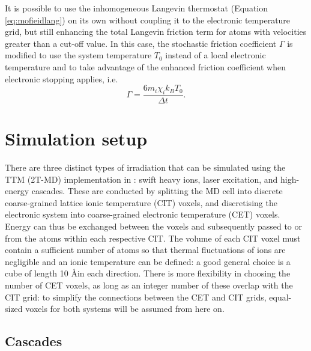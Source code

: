 It is possible to use the inhomogeneous Langevin thermostat (Equation 
\ref{eq:mofieidlang}) on its own without coupling it to the electronic 
temperature grid, but still enhancing the total Langevin friction term for 
atoms with velocities greater than a cut-off value\cite{zarkadoula-13a}. 
In this case, the stochastic friction coefficient $\Gamma$ is modified to 
use the system temperature $T_0$ instead of a local electronic 
temperature and to take advantage of the enhanced friction coefficient 
when electronic stopping applies, i.e.
\begin{equation}
\Gamma = \frac{6 m_{i} \chi_{i} k_B T_0}{\Delta t}.
\end{equation}

\section{Simulation setup}

There are three distinct types of irradiation that can be simulated using 
the TTM (2T-MD) implementation in \D: swift heavy ions, laser excitation, 
and high-energy cascades. These are conducted by splitting the MD cell 
into discrete coarse-grained lattice ionic temperature (CIT) voxels, and 
discretising the electronic system into coarse-grained electronic 
temperature (CET) voxels. Energy can thus be exchanged between the 
voxels and subsequently passed to or from the atoms within each respective 
CIT. The volume of each CIT voxel must contain a sufficient number of atoms 
so that thermal fluctuations of ions are negligible and an ionic temperature 
can be defined: a good general choice is a cube of length 10 \AA in each 
direction. There is more flexibility in choosing the number of CET voxels, 
as long as an integer number of these overlap with the CIT grid: to simplify 
the connections between the CET and CIT grids, equal-sized voxels for both 
systems will be assumed from here on.

\subsection*{Cascades}

